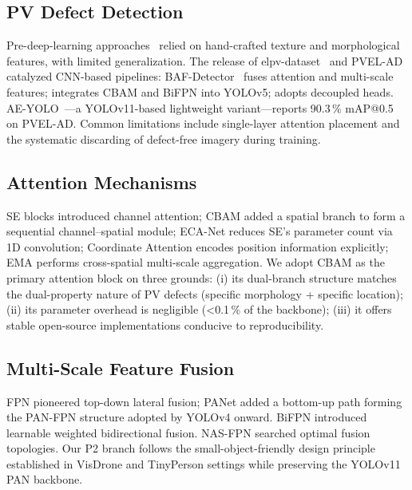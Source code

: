 \documentclass[journal,onecolumn,11pt]{IEEEtran}
\begin{document}
\subsection{PV Defect Detection}
Pre-deep-learning approaches~\cite{tsanakas2016review,anwar2014micro} relied on hand-crafted texture and morphological features, with limited generalization. The release of elpv-dataset~\cite{deitsch2019automatic} and PVEL-AD~\cite{su2023pvelad} catalyzed CNN-based pipelines: BAF-Detector~\cite{su2022baf} fuses attention and multi-scale features; \cite{wang2023yolo5pv} integrates CBAM and BiFPN into YOLOv5; \cite{liu2024pvdetector} adopts decoupled heads. AE-YOLO~\cite{aeyolo2025}---a YOLOv11-based lightweight variant---reports 90.3\,\% mAP@0.5 on PVEL-AD. Common limitations include single-layer attention placement and the systematic discarding of defect-free imagery during training.

\subsection{Attention Mechanisms}
SE blocks \cite{hu2018senet} introduced channel attention; CBAM \cite{woo2018cbam} added a spatial branch to form a sequential channel--spatial module; ECA-Net \cite{wang2020ecanet} reduces SE's parameter count via 1D convolution; Coordinate Attention \cite{hou2021coordatt} encodes position information explicitly; EMA \cite{ouyang2023ema} performs cross-spatial multi-scale aggregation. We adopt CBAM as the primary attention block on three grounds: (i) its dual-branch structure matches the dual-property nature of PV defects (specific morphology + specific location); (ii) its parameter overhead is negligible (\textless 0.1\,\% of the backbone); (iii) it offers stable open-source implementations conducive to reproducibility.

\subsection{Multi-Scale Feature Fusion}
FPN \cite{lin2017fpn} pioneered top-down lateral fusion; PANet \cite{liu2018panet} added a bottom-up path forming the PAN-FPN structure adopted by YOLOv4 onward. BiFPN \cite{tan2020efficientdet} introduced learnable weighted bidirectional fusion. NAS-FPN \cite{ghiasi2019nasfpn} searched optimal fusion topologies. Our P2 branch follows the small-object-friendly design principle established in VisDrone \cite{zhu2022visdrone} and TinyPerson \cite{yu2020tinyperson} settings while preserving the YOLOv11 PAN backbone.
\end{document}
